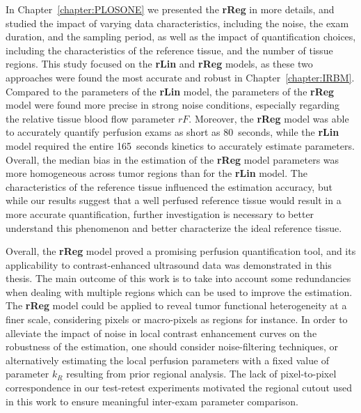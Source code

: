 In Chapter~\ref{chapter:PLOSONE} we presented the \textbf{rReg} in more details, and studied the impact of varying data characteristics, including the noise, the exam duration, and the sampling period, as well as the impact of quantification choices, including the characteristics of the reference tissue, and the number of tissue regions.
This study focused on the \textbf{rLin} and \textbf{rReg} models, as these two approaches were found the most accurate and robust in Chapter~\ref{chapter:IRBM}.
Compared to the parameters of the \textbf{rLin} model, the parameters of the \textbf{rReg} model were found more precise in strong noise conditions, especially regarding the relative tissue blood flow parameter $rF$.
Moreover, the \textbf{rReg} model was able to accurately quantify perfusion exams as short as 80~seconds, while the \textbf{rLin} model required the entire 165~seconds kinetics to accurately estimate parameters.
Overall, the median bias in the estimation of the \textbf{rReg} model parameters was more homogeneous across tumor regions than for the \textbf{rLin} model.
The characteristics of the reference tissue influenced the estimation accuracy, but while our results suggest that a well perfused reference tissue would result in a more accurate quantification, further investigation is necessary to better understand this phenomenon and better characterize the ideal reference tissue.

Overall, the \textbf{rReg} model proved a promising perfusion quantification tool, and its applicability to contrast-enhanced ultrasound data was demonstrated in this thesis.
The main outcome of this work is to take into account some redundancies when dealing with multiple regions which can be used to improve the estimation.
The \textbf{rReg} model could be applied to reveal tumor functional heterogeneity at a finer scale, considering pixels or macro-pixels as regions for instance.
In order to alleviate the impact of noise in local contrast enhancement curves on the robustness of the estimation, one should consider noise-filtering techniques, or alternatively estimating the local perfusion parameters with a fixed value of parameter $k_R$ resulting from prior regional analysis.
The lack of pixel-to-pixel correspondence in our test-retest experiments motivated the regional cutout used in this work to ensure meaningful inter-exam parameter comparison.

